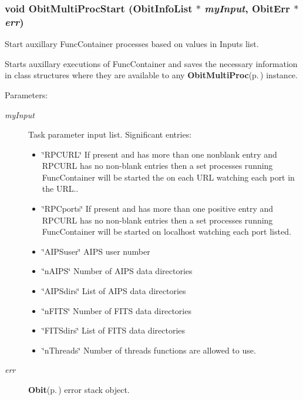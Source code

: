 \subsubsection{\setlength{\rightskip}{0pt plus 5cm}void Obit\-Multi\-Proc\-Start ({\bf Obit\-Info\-List} $\ast$ {\em my\-Input}, {\bf Obit\-Err} $\ast$ {\em err})}\label{ObitMultiProc_8h_a8}


Start auxillary Func\-Container processes based on values in Inputs list. 

Starts auxillary executions of Func\-Container and saves the necessary information in class structures where they are available to any {\bf Obit\-Multi\-Proc}{\rm (p.\,\pageref{structObitMultiProc})} instance. \begin{Desc}
\item[Parameters:]
\begin{description}
\item[{\em my\-Input}]Task parameter input list. Significant entries: \begin{itemize}
\item \char`\"{}RPCURL\char`\"{} If present and has more than one nonblank entry and RPCURL has no non-blank entries then a set processes running Func\-Container will be started the on each URL watching each port in the URL.. \item \char`\"{}RPCports\char`\"{} If present and has more than one positive entry and RPCURL has no non-blank entries then a set processes running Func\-Container will be started on localhost watching each port listed. \item \char`\"{}AIPSuser\char`\"{} AIPS user number \item \char`\"{}n\-AIPS\char`\"{} Number of AIPS data directories \item \char`\"{}AIPSdirs\char`\"{} List of AIPS data directories \item \char`\"{}n\-FITS\char`\"{} Number of FITS data directories \item \char`\"{}FITSdirs\char`\"{} List of FITS data directories \item \char`\"{}n\-Threads\char`\"{} Number of threads functions are allowed to use. \end{itemize}
\item[{\em err}]{\bf Obit}{\rm (p.\,\pageref{structObit})} error stack object. \end{description}
\end{Desc}
